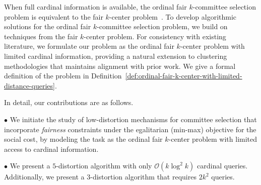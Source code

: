 \documentclass{article}
\newcommand{\bigO}{\ensuremath{\mathcal{O}}\xspace}
\begin{document}
When full cardinal information is available, the ordinal fair $k$-committee selection problem is equivalent to the fair $k$-center problem~\cite{kleindessner2019fair}. 
To develop algorithmic solutions for the ordinal fair $k$-committee selection problem, we build on techniques from the fair $k$-center problem. 
For consistency with existing literature, we formulate our problem as the ordinal fair $k$-center problem with limited cardinal information, providing a natural extension to clustering methodologies that maintains alignment with prior work. 
We give a formal definition of the problem in Definition~\ref{def:ordinal-fair-k-center-with-limited-distance-queries}.




In detail, our contributions are as follows.

$\bullet$ We initiate the study of low-distortion mechanisms for committee selection that incorporate \emph{fairness} constraints under the egalitarian (min-max) objective for the social cost, by modeling the task as the ordinal fair $k$-center problem with limited access to cardinal information. 

$\bullet$ We present a $5$-distortion algorithm with only $\bigO(k \log ^2 k)$ cardinal queries. 
Additionally, we present a $3$-distortion algorithm that requires $2k^2$ queries. 
\end{document}
